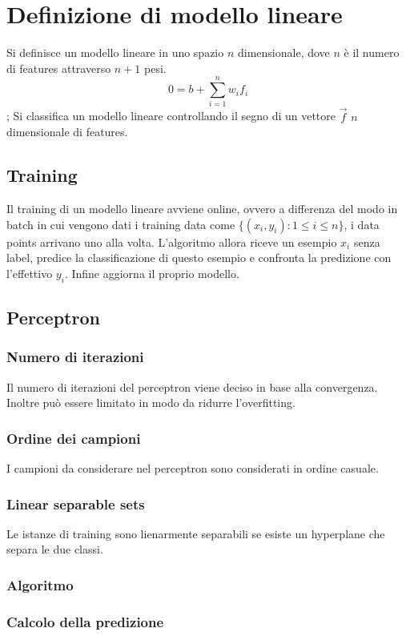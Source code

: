 \section{Definizione di modello lineare}
Si definisce un modello lineare in uno spazio $n$ dimensionale, dove $n$ \`e il numero di features attraverso $n+1$ pesi.
$$0=b+\sum\limits_{i=1}^nw_if_i$$;
Si classifica un modello lineare controllando il segno di un vettore $\overrightarrow{f}$ $n$ dimensionale di features.

	\subsection{Training}
	Il training di un modello lineare avviene online, ovvero a differenza del modo in batch in cui vengono dati i training data come $\{(x_i, y_i):1\le i\le n\}$, i data points arrivano uno alla volta.
	L'algoritmo allora riceve un esempio $x_i$ senza label, predice la classificazione di questo esempio e confronta la predizione con l'effettivo $y_i$.
	Infine aggiorna il proprio modello.

	\subsection{Perceptron}

		\subsubsection{Numero di iterazioni}
		Il numero di iterazioni del perceptron viene deciso in base alla convergenza.
		Inoltre pu\`o essere limitato in modo da ridurre l'overfitting.

		\subsubsection{Ordine dei campioni}
		I campioni da considerare nel perceptron sono considerati in ordine casuale.

		\subsubsection{Linear separable sets}
		Le istanze di training sono lienarmente separabili se esiste un hyperplane che separa le due classi.

		\subsubsection{Algoritmo}
		

		\subsubsection{Calcolo della predizione}
		
